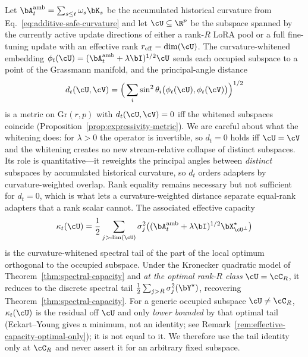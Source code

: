 Let $\bA_t^{\mathrm{amb}}=\sum_{s\le t}\omega_s\bK_s$ be the accumulated
historical curvature from Eq.~\eqref{eq:additive-safe-curvature} and let
$\cU\subseteq\R^p$ be the subspace spanned by the currently active update
directions of either a rank-$R$ LoRA pool or a full fine-tuning update with an
effective rank $r_{\mathrm{eff}}=\dim(\cU)$. The curvature-whitened embedding
$\phi_t(\cU)=(\bA_t^{\mathrm{amb}}+\lambda\bI)^{1/2}\cU$ sends each occupied
subspace to a point of the Grassmann manifold, and the principal-angle distance
\begin{equation}
  d_t(\cU,\cV)
  =\Big(\sum_i\sin^2\theta_i\big(\phi_t(\cU),\phi_t(\cV)\big)\Big)^{1/2}
  \label{eq:expressivity-distance}
\end{equation}
is a metric on $\mathrm{Gr}(r,p)$ with $d_t(\cU,\cV)=0$ iff the whitened
subspaces coincide (Proposition~\ref{prop:expressivity-metric}). We are careful
about what the whitening does: for $\lambda>0$ the operator is invertible, so
$d_t=0$ holds iff $\cU=\cV$ and the whitening creates no new stream-relative
collapse of distinct subspaces. Its role is quantitative---it reweights the
principal angles between \emph{distinct} subspaces by accumulated historical
curvature, so $d_t$ orders adapters by curvature-weighted overlap. Rank equality
remains necessary but not sufficient for $d_t=0$, which is what lets a
curvature-weighted distance separate equal-rank adapters that a rank scalar
cannot.
The associated effective capacity
\begin{equation}
  \kappa_t(\cU)
  =\frac12\sum_{j>\dim(\cU)}\sigma_j^2
  \big((\bA_t^{\mathrm{amb}}+\lambda\bI)^{1/2}\bX^\star_{\cU^\perp}\big)
  \label{eq:effective-capacity}
\end{equation}
is the curvature-whitened spectral tail of the part of the local optimum
orthogonal to the occupied subspace. Under the Kronecker quadratic model of
Theorem~\ref{thm:spectral-capacity} and \emph{at the optimal rank-$R$ class}
$\cU=\cC_R$, it reduces to the discrete spectral tail
$\frac12\sum_{j>R}\sigma_j^2(\bY^\star)$, recovering
Theorem~\ref{thm:spectral-capacity}. For a generic occupied subspace
$\cU\neq\cC_R$, $\kappa_t(\cU)$ is the residual off $\cU$ and only \emph{lower
bounded} by that optimal tail (Eckart--Young gives a minimum, not an identity;
see Remark~\ref{rem:effective-capacity-optimal-only}); it is not equal to it. We
therefore use the tail identity only at $\cC_R$ and never assert it for an
arbitrary fixed subspace.

